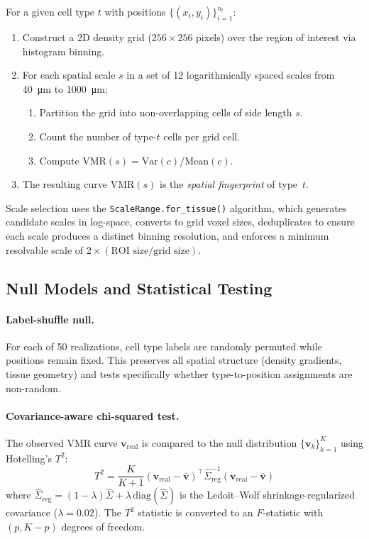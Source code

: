 \documentclass[11pt,a4paper]{article}
\newcommand{\vmr}{\mathrm{VMR}}
\begin{document}
For a given cell type $t$ with positions $\{(x_i, y_i)\}_{i=1}^{n_t}$:

\begin{enumerate}
  \item Construct a 2D density grid ($256 \times 256$ pixels) over the region
    of interest via histogram binning.
  \item For each spatial scale $s$ in a set of 12 logarithmically spaced
    scales from \SI{40}{\micro\meter} to \SI{1000}{\micro\meter}:
    \begin{enumerate}
      \item Partition the grid into non-overlapping cells of side length $s$.
      \item Count the number of type-$t$ cells per grid cell.
      \item Compute $\vmr(s) = \mathrm{Var}(c) / \mathrm{Mean}(c)$.
    \end{enumerate}
  \item The resulting curve $\vmr(s)$ is the \emph{spatial fingerprint} of type~$t$.
\end{enumerate}

Scale selection uses the \texttt{ScaleRange.for\_tissue()} algorithm, which
generates candidate scales in log-space, converts to grid voxel sizes, deduplicates
to ensure each scale produces a distinct binning resolution, and enforces a
minimum resolvable scale of $2 \times (\text{ROI size} / \text{grid size})$.

\subsection{Null Models and Statistical Testing}
\label{sec:null}

\paragraph{Label-shuffle null.}
For each of 50 realizations, cell type labels are randomly permuted while
positions remain fixed. This preserves all spatial structure (density gradients,
tissue geometry) and tests specifically whether type-to-position assignments are
non-random.

\paragraph{Covariance-aware chi-squared test.}
The observed VMR curve $\mathbf{v}_\text{real}$ is compared to the null
distribution $\{\mathbf{v}_k\}_{k=1}^{K}$ using Hotelling's $T^2$:
\begin{equation}
  T^2 = \frac{K}{K+1} (\mathbf{v}_\text{real} - \bar{\mathbf{v}})^\top
  \hat{\Sigma}^{-1}_\text{reg}
  (\mathbf{v}_\text{real} - \bar{\mathbf{v}})
\end{equation}
where $\hat{\Sigma}_\text{reg} = (1-\lambda)\hat{\Sigma} + \lambda \,
\mathrm{diag}(\hat{\Sigma})$ is the Ledoit--Wolf shrinkage-regularized
covariance ($\lambda = 0.02$). The $T^2$ statistic is converted to an
$F$-statistic with $(p, K-p)$ degrees of freedom.
\end{document}
